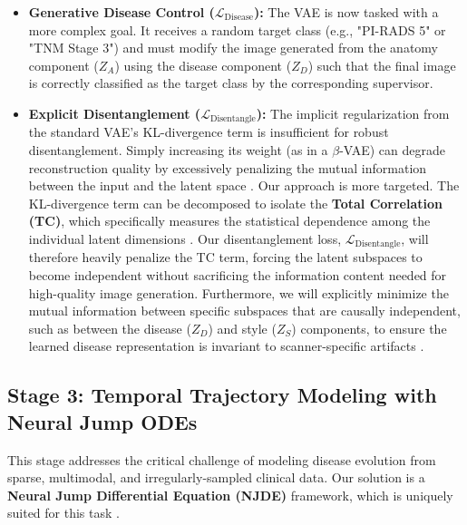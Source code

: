 \documentclass[11pt, a4paper]{article}
\begin{document}
\begin{enumerate}
    \begin{itemize}
        \item \textbf{Generative Disease Control ($\mathcal{L}_{\text{Disease}}$):} The VAE is now tasked with a more complex goal. It receives a random target class (e.g., "PI-RADS 5" or "TNM Stage 3") and must modify the image generated from the anatomy component ($Z_A$) using the disease component ($Z_D$) such that the final image is correctly classified as the target class by the corresponding supervisor.
        \item \textbf{Explicit Disentanglement ($\mathcal{L}_{\text{Disentangle}}$):} The implicit regularization from the standard VAE's KL-divergence term is insufficient for robust disentanglement. Simply increasing its weight (as in a $\beta$-VAE) can degrade reconstruction quality by excessively penalizing the mutual information between the input and the latent space \cite{FragemannArdizzone2022, CetinStephens2022}. Our approach is more targeted. The KL-divergence term can be decomposed to isolate the \textbf{Total Correlation (TC)}, which specifically measures the statistical dependence among the individual latent dimensions \cite{FragemannArdizzone2022, AbbasiMonadjemi2018}. Our disentanglement loss, $\mathcal{L}_{\text{Disentangle}}$, will therefore heavily penalize the TC term, forcing the latent subspaces to become independent without sacrificing the information content needed for high-quality image generation. Furthermore, we will explicitly minimize the mutual information between specific subspaces that are causally independent, such as between the disease ($Z_D$) and style ($Z_S$) components, to ensure the learned disease representation is invariant to scanner-specific artifacts \cite{FayCobos2023}.
    \end{itemize}
\end{enumerate}

\subsection{Stage 3: Temporal Trajectory Modeling with Neural Jump ODEs}
This stage addresses the critical challenge of modeling disease evolution from sparse, multimodal, and irregularly-sampled clinical data. Our solution is a \textbf{Neural Jump Differential Equation (NJDE)} framework, which is uniquely suited for this task \cite{GwakSim2020}.
\end{document}
